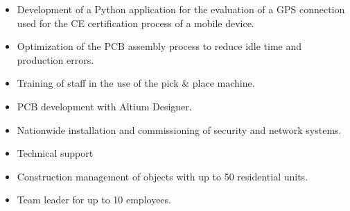 %
%
\begin{itemize}
\item Development of a Python application for the evaluation of a GPS connection used for the CE certification process of a mobile device.
\item Optimization of the PCB assembly process to reduce idle time and production errors.
\item Training of staff in the use of the pick \& place machine.
\item PCB development with Altium Designer.
\end{itemize}
%
\divider
%
\begin{itemize}
\item Nationwide installation and commissioning of security and network systems.
\item Technical support
\end{itemize}
%
\divider
%
\begin{itemize}
\item Construction management of objects with up to 50 residential units.
\item Team leader for up to 10 employees.
\end{itemize}
%